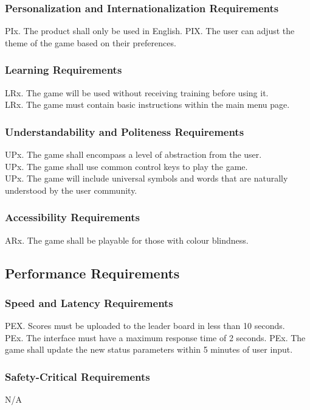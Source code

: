 \documentclass{article}
\begin{document}
    \subsubsection{Personalization and Internationalization Requirements}
    PIx. The product shall only be used in English.
    PIX. The user can adjust the theme of the game based on their preferences.
    
    \subsubsection{Learning Requirements}
    LRx. The game will be used without receiving training before using it.\\
    LRx. The game must contain basic instructions within the main menu page.

    \subsubsection{Understandability and Politeness Requirements}
    UPx. The game shall encompass a level of abstraction from the user.\\
    UPx. The game shall use common control keys to play the game.\\
    UPx. The game will include universal symbols and words that are naturally understood by the user community.
    
    \subsubsection{Accessibility Requirements}
    ARx. The game shall be playable for those with colour blindness.
    
\subsection{Performance Requirements}
    \subsubsection{Speed and Latency Requirements}
    PEX. Scores must be uploaded to the leader board in less than 10 seconds.\\
    PEx. The interface must have a maximum response time of 2 seconds.
    PEx. The game shall update the new status parameters within 5 minutes of user input.

    \subsubsection{Safety-Critical Requirements}
    N/A
    
\end{document}
